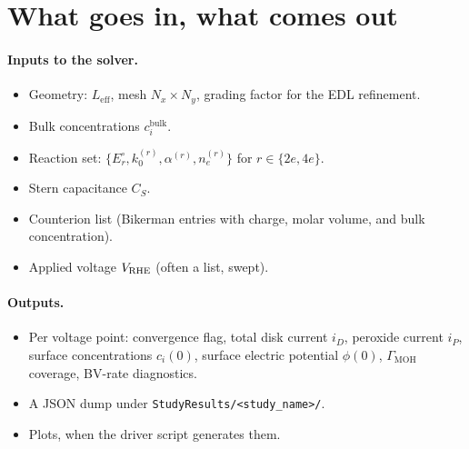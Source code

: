 \documentclass[11pt]{article}
\begin{document}
\section{What goes in, what comes out}

\paragraph{Inputs to the solver.}
\begin{itemize}[leftmargin=*]
\item Geometry: $L_{\mathrm{eff}}$, mesh $N_x \times N_y$, grading
      factor for the EDL refinement.
\item Bulk concentrations $c_i^{\mathrm{bulk}}$.
\item Reaction set: $\{E^{\circ}_r, k_0^{(r)}, \alpha^{(r)}, n_e^{(r)}\}$ for
      $r \in \{2e, 4e\}$.
\item Stern capacitance $C_S$.
\item Counterion list (Bikerman entries with charge, molar volume,
      and bulk concentration).
\item Applied voltage $V_{\mathrm{RHE}}$ (often a list, swept).
\end{itemize}

\paragraph{Outputs.}
\begin{itemize}[leftmargin=*]
\item Per voltage point: convergence flag, total disk current $i_D$,
      peroxide current $i_P$, surface concentrations
      $c_i(0)$, surface electric potential $\phi(0)$, $\Gamma_{\mathrm{MOH}}$
      coverage, BV-rate diagnostics.
\item A JSON dump under \texttt{StudyResults/<study\_name>/}.
\item Plots, when the driver script generates them.
\end{itemize}

\onboardingfooter
\end{document}
